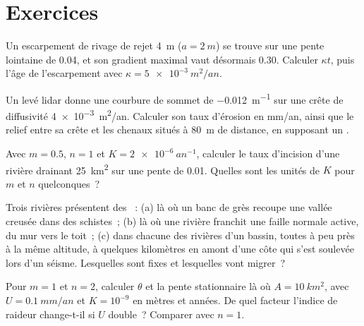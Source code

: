 \section{Exercices}

\begin{exercise}[$\star$]\label{exo:b3:quantitative-geomorphology:1}
Un escarpement de rivage de rejet \qty{4}{m} ($a = \qty{2}{m}$) se trouve
sur une pente lointaine de 0.04, et son gradient maximal vaut désormais 0.30. Calculer
$\kappa t$, puis l'âge de l'escarpement avec $\kappa = \qty{5e-3}{m^2/an}$.
\end{exercise}

\begin{exercise}[$\star$]\label{exo:b3:quantitative-geomorphology:2}
Un levé lidar donne une courbure de sommet de \qty{-0.012}{m^{-1}} sur une crête
de diffusivité \qty{4e-3}{m^2/an}. Calculer son taux d'érosion en
\unit{mm/an}, ainsi que le relief entre sa crête et les chenaux situés
à \qty{80}{m} de distance, en supposant un .
\end{exercise}

\begin{exercise}[$\star$]\label{exo:b3:quantitative-geomorphology:3}
Avec $m = 0.5$, $n = 1$ et $K = \qty{2e-6}{an^{-1}}$, calculer le taux
d'incision d'une rivière drainant \qty{25}{km^2} sur une pente de 0.01.
Quelles sont les unités de $K$ pour $m$ et $n$ quelconques~?
\end{exercise}

\begin{exercise}[$\star$]\label{exo:b3:quantitative-geomorphology:4}
Trois rivières présentent des ~: (a) là où un banc de grès recoupe une vallée
creusée dans des schistes~; (b) là où une rivière franchit une faille normale active,
du mur vers le toit~; (c) dans chacune des rivières d'un bassin, toutes à peu près
à la même altitude, à quelques kilomètres en amont d'une côte qui s'est soulevée
lors d'un séisme. Lesquelles sont fixes et lesquelles vont migrer~?
\end{exercise}

\begin{exercise}[$\star\star$]\label{exo:b3:quantitative-geomorphology:5}
Pour $m = 1$ et $n = 2$, calculer $\theta$ et la pente stationnaire là où $A =
\qty{10}{km^2}$, avec $U = \qty{0.1}{mm/an}$ et $K = 10^{-9}$ en mètres et
années.
De quel facteur l'indice de raideur change-t-il si $U$ double~? Comparer avec $n =
1$.
\end{exercise}

